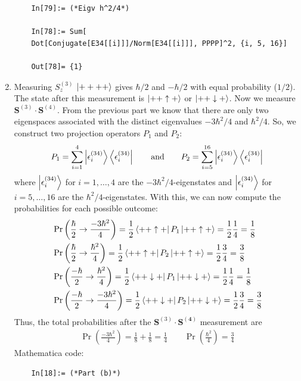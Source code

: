 \documentclass{article}
\theoremstyle{definition}
\newcommand{\f}[2]{\frac{#1}{#2}}
\newcommand{\lp}{\left(}
\newcommand{\rp}{\right)}
\begin{document}
\begin{enumerate}[label=(\alph*)]
\begin{lstlisting}
	In[79]:= (*Eigv h^2/4*)
	
	In[78]:= Sum[
	Dot[Conjugate[E34[[i]]]/Norm[E34[[i]]], PPPP]^2, {i, 5, 16}]
	
	Out[78]= {1}
	\end{lstlisting}
	
	
	
	\item Measuring $S_z^{(3)}$ $\ket{++++}$ gives $\hbar/2$ and $-\hbar/2$ with equal probability ($1/2$). The state after this measurement is $\ket{++\uparrow +}$ or $\ket{++\downarrow +}$. Now we measure $\mathbf{S}^{(3)}\cdot \mathbf{S}^{(4)}$. From the previous part we know that there are only two eigenspaces associated with the distinct eigenvalues $-3\hbar^2/4$ and $\hbar^2/4$. So, we construct two projection operators $P_1$ and $P_2$:
	\begin{align*}
	P_1 = \sum_{i=1}^4 \ket{ \epsilon^{(34)}_i} \bra{\epsilon^{(34)}_i} \quad\quad \text{and}\quad\quad P_2 = \sum_{i=5}^{16} \ket{ \epsilon^{(34)}_i} \bra{\epsilon^{(34)}_i}
	\end{align*}
	where $\ket{ \epsilon^{(34)}_i}$ for $i=1,\dots,4$ are the $-3\hbar^2/4$-eigenstates and $\ket{ \epsilon^{(34)}_i}$ for $i=5,\dots,16$ are the $\hbar^2/4$-eigenstates. With this, we can now compute the probabilities for each possible outcome:
	\begin{align*}
	&\Pr\lp \f{\hbar}{2} \to \f{-3\hbar^2}{4} \rp = \f{1}{2} \bra{++\uparrow +} P_1 \ket{++\uparrow +} = \f{1}{2}\f{1}{4} = \f{1}{8} \\
	&\Pr\lp \f{\hbar}{2} \to \f{\hbar^2}{4} \rp =  \f{1}{2} \bra{++\uparrow +} P_2 \ket{++\uparrow +} = \f{1}{2}\f{3}{4} = \f{3}{8}\\
	&\Pr\lp \f{-\hbar}{2} \to \f{\hbar^2}{4} \rp =  \f{1}{2} \bra{++\downarrow +} P_1 \ket{++\downarrow +} = \f{1}{2}\f{1}{4} = \f{1}{8}\\
	&\Pr\lp \f{-\hbar}{2} \to \f{-3\hbar^2}{4} \rp =  \f{1}{2} \bra{++\downarrow +} P_2 \ket{++\downarrow +} = \f{1}{2}\f{3}{4} = \f{3}{8}
	\end{align*}
	Thus, the total probabilities after the $\mathbf{S}^{(3)}\cdot \mathbf{S^{(4)}}$ measurement are 
	\begin{align*}
	\boxed{\Pr\lp \f{-3\hbar^2}{4} \rp = \f{1}{8} + \f{1}{8} = {\f{1}{4}}} \quad\quad 
	\boxed{\Pr\lp \f{\hbar^2}{4} \rp = \f{3}{4}}
	\end{align*}
	Mathematica code:
	\begin{lstlisting}
	In[18]:= (*Part (b)*)
	

\end{lstlisting}
\end{enumerate}
\end{document}
